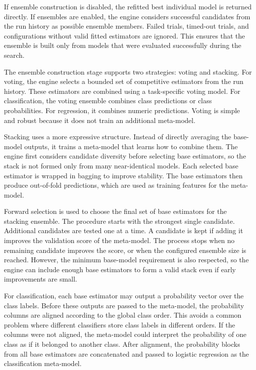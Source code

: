\documentclass[12pt,a4paper]{report}
\begin{document}
\noindent If ensemble construction is disabled, the refitted best individual model is
returned directly. If ensembles are enabled, the engine considers successful
candidates from the run history as possible ensemble members. Failed trials,
timed-out trials, and configurations without valid fitted estimators are ignored.
This ensures that the ensemble is built only from models that were evaluated
successfully during the search.

\noindent The ensemble construction stage supports two strategies: voting and stacking.
For voting, the engine selects a bounded set of competitive estimators from the
run history. These estimators are combined using a task-specific voting model.
For classification, the voting ensemble combines class predictions or class
probabilities. For regression, it combines numeric predictions. Voting is simple
and robust because it does not train an additional meta-model.

\noindent Stacking uses a more expressive structure. Instead of directly averaging the
base-model outputs, it trains a meta-model that learns how to combine them. The
engine first considers candidate diversity before selecting base estimators, so
the stack is not formed only from many near-identical models. Each selected base
estimator is wrapped in bagging to improve stability. The base estimators then
produce out-of-fold predictions, which are used as training features for the
meta-model.

\noindent Forward selection is used to choose the final set of base estimators for the
stacking ensemble. The procedure starts with the strongest single candidate.
Additional candidates are tested one at a time. A candidate is kept if adding it
improves the validation score of the meta-model. The process stops when no
remaining candidate improves the score, or when the configured ensemble size is
reached. However, the minimum base-model requirement is also respected, so the
engine can include enough base estimators to form a valid stack even if early
improvements are small.

\noindent For classification, each base estimator may output a probability vector over the
class labels. Before these outputs are passed to the meta-model, the probability
columns are aligned according to the global class order. This avoids a common
problem where different classifiers store class labels in different orders. If
the columns were not aligned, the meta-model could interpret the probability of
one class as if it belonged to another class. After alignment, the probability
blocks from all base estimators are concatenated and passed to logistic
regression as the classification meta-model.
\end{document}
